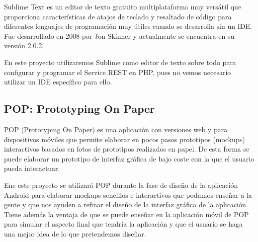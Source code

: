     Sublime Text \cite{ref:sublime} es un editor de texto gratuito multiplataforma muy versátil que proporciona características de atajos de teclado y resaltado de código para diferentes lenguajes de programación muy útiles cuando se desarrolla sin un IDE. Fue desarrollado en 2008 por Jon Skinner y actualmente se encuentra en su versión 2.0.2.
    
    En este proyecto utilizaremos Sublime como editor de texto sobre todo para configurar y programar el Service REST en PHP, pues no vemos necesario utilizar un IDE específico para ello.
    
    \subsection{POP: Prototyping On Paper}\label{ssec:pop}
    
    POP \cite{ref:pop} (Prototyping On Paper) es una aplicación con versiones web y para dispositivos móviles que permite elaborar en pocos pasos prototipos (mockups) interactivos basados en fotos de prototipos realizados en papel. De esta forma se puede elaborar un prototipo de interfaz gráfica de bajo coste con la que el usuario pueda interactuar.
    
    Ene este proyecto se utilizará POP durante la fase de diseño de la aplicación Android para elaborar mockups sencillos e interactivos que podamos enseñar a la gente y que nos ayuden a refinar el diseño de la interfaz gráfica de la aplicación. Tiene además la ventaja de que se puede enseñar en la aplicación móvil de POP para simular el aspecto final que tendría la aplicación y que el usuario se haga una mejor idea de lo que pretendemos diseñar.
    